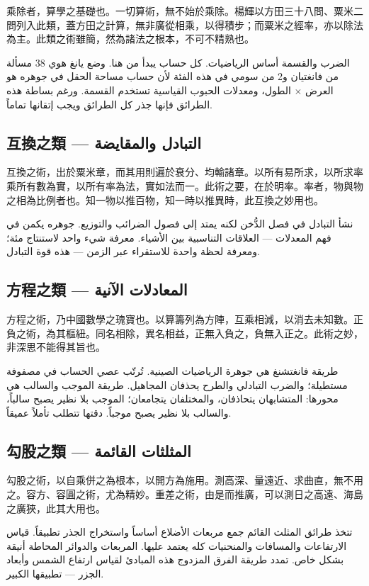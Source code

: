 \documentclass[11pt,a4paper]{article}
\newcommand{\ar}[1]{\arabicfont\beginR #1\endR}
\newcommand{\ChinCol}[1]{\begin{minipage}[t]{0.48\textwidth}#1\end{minipage}}
\newcommand{\ArabCol}[1]{\begin{minipage}[t]{0.48\textwidth}\arabicfont\beginR #1\endR\end{minipage}}
\newcommand{\parallelsection}[2]{%
  \noindent\ChinCol{#1}\hfill\ArabCol{#2}\par\vspace{0.5cm}%
}
\begin{document}
\parallelsection{%
乘除者，算學之基礎也。一切算術，無不始於乘除。楊輝以方田三十八問、粟米二問列入此類，蓋方田之計算，無非廣從相乘，以得積步；而粟米之經率，亦以除法為主。此類之術雖簡，然為諸法之根本，不可不精熟也。
}{%
الضرب والقسمة أساس الرياضيات. كل حساب يبدأ من هنا. وضع يانغ هوي 38 مسألة من فانغتيان و2 من سومي في هذه الفئة لأن حساب مساحة الحقل في جوهره هو العرض $\times$ الطول، ومعدلات الحبوب القياسية تستخدم القسمة. ورغم بساطة هذه الطرائق فإنها جذر كل الطرائق ويجب إتقانها تماماً.
}

\subsection*{互換之類 --- \ar{التبادل والمقايضة}}

\parallelsection{%
互換之術，出於粟米章，而其用則遍於衰分、均輸諸章。以所有易所求，以所求率乘所有數為實，以所有率為法，實如法而一。此術之要，在於明率。率者，物與物之相為比例者也。知一物以推百物，知一時以推異時，此互換之妙用也。
}{%
نشأ التبادل في فصل الدُّخن لكنه يمتد إلى فصول الضرائب والتوزيع. جوهره يكمن في فهم المعدلات --- العلاقات التناسبية بين الأشياء. معرفة شيء واحد لاستنتاج مئة؛ ومعرفة لحظة واحدة للاستقراء عبر الزمن --- هذه قوة التبادل.
}

\subsection*{方程之類 --- \ar{المعادلات الآنية}}

\parallelsection{%
方程之術，乃中國數學之瑰寶也。以算籌列為方陣，互乘相減，以消去未知數。正負之術，為其樞紐。同名相除，異名相益，正無入負之，負無入正之。此術之妙，非深思不能得其旨也。
}{%
طريقة فانغتشنغ هي جوهرة الرياضيات الصينية. تُرتّب عصي الحساب في مصفوفة مستطيلة؛ والضرب التبادلي والطرح يحذفان المجاهيل. طريقة الموجب والسالب هي محورها: المتشابهان يتحاذفان، والمختلفان يتجامعان؛ الموجب بلا نظير يصبح سالباً، والسالب بلا نظير يصبح موجباً. دقتها تتطلب تأملاً عميقاً.
}

\subsection*{勾股之類 --- \ar{المثلثات القائمة}}

\parallelsection{%
勾股之術，以自乘併之為根本，以開方為施用。測高深、量遠近、求曲直，無不用之。容方、容圓之術，尤為精妙。重差之術，由是而推廣，可以測日之高遠、海島之廣狹，此其大用也。
}{%
تتخذ طرائق المثلث القائم جمع مربعات الأضلاع أساساً واستخراج الجذر تطبيقاً. قياس الارتفاعات والمسافات والمنحنيات كله يعتمد عليها. المربعات والدوائر المحاطة أنيقة بشكل خاص. تمدد طريقة الفرق المزدوج هذه المبادئ لقياس ارتفاع الشمس وأبعاد الجزر --- تطبيقها الكبير.
}
\end{document}
